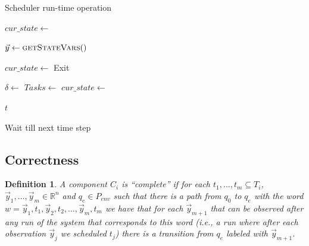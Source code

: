 \documentclass[ twoside, 12pt ]{article}
\newcommand\R{{\mathbb R}}
\newtheorem{dfn}{Definition} %
\begin{document}
\begin{algorithm}[h]
    \caption{Scheduler run-time operation}
    \begin{algorithmic}[1]
         
            \State $cur\_state \gets$  
            
            \Statex
            \Loop 
                \State $\vec{y} \gets \Call{getStateVars}$
                
                \State $cur\_state \gets$  
                    \State Exit 
                \EndIf
                
                \Statex
                \State $\delta \gets$  
                \State $Tasks \gets$ 
                \State $cur\_state \gets$ 
                
                 
                    \State {} {$t$}
                \EndFor
                
                \Statex
                \State Wait till next time step
                
            \EndLoop
        \EndProcedure
    \end{algorithmic}
    \label{code:scheduler}
\end{algorithm}

\subsection{Correctness}

\begin{dfn}
    A component $C_i$ is ``complete'' if for each $t_1, \dots, t_m \subseteq T_i$, $\vec{y}_1, \dots , \vec{y}_m \in \R^n$ and $q_e \in P_{env}$ such that there is a path from $q_0$ to $q_e$ with the word $w= \vec{y}_1 , t_1 , \vec{y}_2 , t_2, \dots , \vec{y}_{m}, t_m$ we have that for each $\vec{y}_{m+1}$ that can be observed after any run of the system that corresponds to this word (i.e., a run where after each observation $\vec{y}_j$ we scheduled $t_j$) there is a transition from $q_e$ labeled with $\vec{y}_{m+1}$.
\end{dfn}
\end{document}
